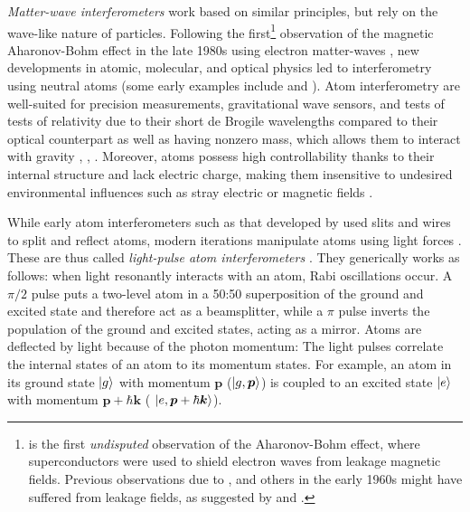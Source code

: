 \documentclass[reprint,
nofootinbib,
amsmath,amssymb,
aps]{revtex4-1}
\begin{document}
\textit{Matter-wave interferometers} work based on similar principles, but rely on the wave-like nature of particles. Following the first\footnote{\cite{tonomura1986evidence} is the first \textit{undisputed} observation of the Aharonov-Bohm effect, where superconductors were used to shield electron waves from leakage magnetic fields. Previous observations due to \cite{chambers1960shift}, \cite{fowler1961electron} and others in the early 1960s might have suffered from leakage fields, as suggested by \cite{bocchieri1978nonexistence} and \cite{roy1980condition}.   } observation of the magnetic Aharonov-Bohm effect in the late 1980s using electron matter-waves \cite{tonomura1986evidence}, new developments in atomic, molecular, and optical physics led to interferometry using neutral atoms (some early examples include \cite{keith1991interferometer} and \cite{carnal1991young}). Atom interferometry are well-suited for precision measurements, gravitational wave sensors, and tests of tests of relativity due to their short de Brogile wavelengths compared to their optical counterpart as well as having nonzero mass, which allows them to interact with gravity \cite{mueller2014quantum}, \cite{dimopoulos2009gravitational}, \cite{stray2022quantum}. Moreover, atoms possess high controllability thanks to their internal structure and lack electric charge, making them insensitive to undesired environmental influences such as stray electric or magnetic fields \cite{bongs2019taking}. 


While early atom interferometers such as that developed by \cite{keith1991interferometer} used slits and wires to split and reflect atoms, modern iterations manipulate atoms using light forces \cite{rasel1995atom}. These are thus called \textit{light-pulse atom interferometers} \cite{kasevich1992measurement}. They generically works as follows: when light resonantly interacts with an atom, Rabi oscillations occur. A $\pi/2$ pulse puts a two-level atom in a 50:50 superposition of the ground and excited state and therefore act as a beamsplitter, while a $\pi$ pulse inverts the population of the ground and excited states, acting as a mirror.  Atoms are deflected by light because of the photon momentum: The light pulses correlate the internal states of an atom to its momentum states. For example, an atom in its ground state $\ket{g}$ with momentum $\bm{p}$ ($\ket{g,\bm{p}}$) is coupled to an excited state $\ket{e}$ with momentum $\bm{p} + \hbar \bm{k}$ ( $\ket{e,\bm{p} + \hbar\bm{k}}$).  
\end{document}
